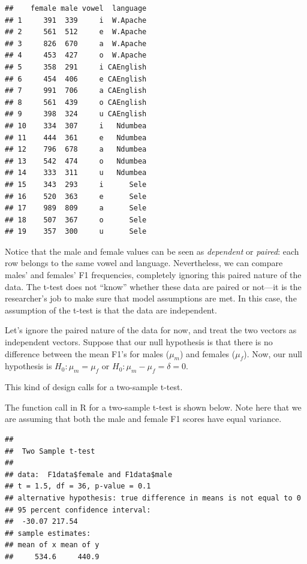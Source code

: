 \documentclass[12pt,]{krantz}
\newenvironment{Shaded}{\begin{snugshade}}{\end{snugshade}}
\newcommand{\DataTypeTok}[1]{\textcolor[rgb]{0.13,0.29,0.53}{#1}}
\newcommand{\KeywordTok}[1]{\textcolor[rgb]{0.13,0.29,0.53}{\textbf{#1}}}
\newcommand{\NormalTok}[1]{#1}
\newcommand{\OperatorTok}[1]{\textcolor[rgb]{0.81,0.36,0.00}{\textbf{#1}}}
\newcommand{\OtherTok}[1]{\textcolor[rgb]{0.56,0.35,0.01}{#1}}
\begin{document}
\begin{verbatim}
##    female male vowel  language
## 1     391  339     i  W.Apache
## 2     561  512     e  W.Apache
## 3     826  670     a  W.Apache
## 4     453  427     o  W.Apache
## 5     358  291     i CAEnglish
## 6     454  406     e CAEnglish
## 7     991  706     a CAEnglish
## 8     561  439     o CAEnglish
## 9     398  324     u CAEnglish
## 10    334  307     i   Ndumbea
## 11    444  361     e   Ndumbea
## 12    796  678     a   Ndumbea
## 13    542  474     o   Ndumbea
## 14    333  311     u   Ndumbea
## 15    343  293     i      Sele
## 16    520  363     e      Sele
## 17    989  809     a      Sele
## 18    507  367     o      Sele
## 19    357  300     u      Sele
\end{verbatim}

Notice that the male and female values can be seen as \emph{dependent} or \emph{paired}: each row belongs to the same vowel and language. Nevertheless, we can compare males' and females' F1 frequencies, completely ignoring this paired nature of the data. The t-test does not ``know'' whether these data are paired or not---it is the researcher's job to make sure that model assumptions are met. In this case, the assumption of the t-test is that the data are independent.

Let's ignore the paired nature of the data for now, and treat the two vectors as independent vectors. Suppose that our null hypothesis is that there is no difference between the mean F1's for males (\(\mu_m\)) and females (\(\mu_f\)).
Now, our null hypothesis is \(H_0: \mu_m = \mu_f\) or \(H_0: \mu_m - \mu_f = \delta = 0\).

This kind of design calls for a two-sample t-test.

The function call in R for a two-sample t-test is shown below. Note here that we are assuming that both the male and female F1 scores have equal variance.

\begin{Shaded}
\end{Shaded}

\begin{verbatim}
## 
## 	Two Sample t-test
## 
## data:  F1data$female and F1data$male
## t = 1.5, df = 36, p-value = 0.1
## alternative hypothesis: true difference in means is not equal to 0
## 95 percent confidence interval:
##  -30.07 217.54
## sample estimates:
## mean of x mean of y 
##     534.6     440.9
\end{verbatim}
\end{document}
